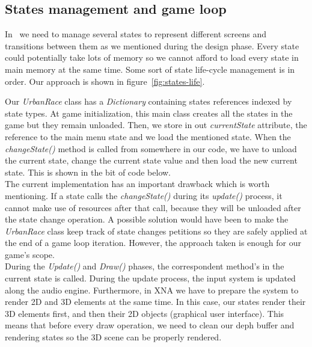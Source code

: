 

\subsection{States management and game loop}

In \game\ we need to manage several states to represent different screens and transitions
between them as we mentioned during the design phase. Every state could potentially take
lots of memory so we cannot afford to load every state in main memory at the same time.
Some sort of state life-cycle management is in order. Our approach is shown in figure~\ref{fig:states-life}.


Our \textit{UrbanRace} class has a \textit{Dictionary} containing states references
indexed by state types. At game initialization, this main class creates all the states in
the game but they remain unloaded. Then, we store in out \textit{currentState} attribute,
the reference to the main menu state and we load the mentioned state. When the \textit{changeState()}
method is called from somewhere in our code, we have to unload the current state, change the
current state value and then load the new current state. This is shown in the bit of code below.\\



The current implementation has an important drawback which is worth mentioning. If a state
calls the \textit{changeState()} during its \textit{update()} process, it cannot make use
of resources after that call, because they will be unloaded after the state change operation.
A possible solution would have been to make the \textit{UrbanRace} class keep track of
state changes petitions so they are safely applied at the end of a game loop iteration. However,
the approach taken is enough for our game's scope.\\

During the \textit{Update()} and \textit{Draw()} phases, the correspondent method's in the
current state is called. During the update process, the input system is
updated along the audio engine. Furthermore, in XNA we have to prepare the system to render 2D
and 3D elements at the same time. In this case, our states render their 3D elements first, 
and then their 2D objects (graphical user interface). This means that before every draw
operation, we need to clean our deph buffer and rendering states so the 3D scene can be
properly rendered.

